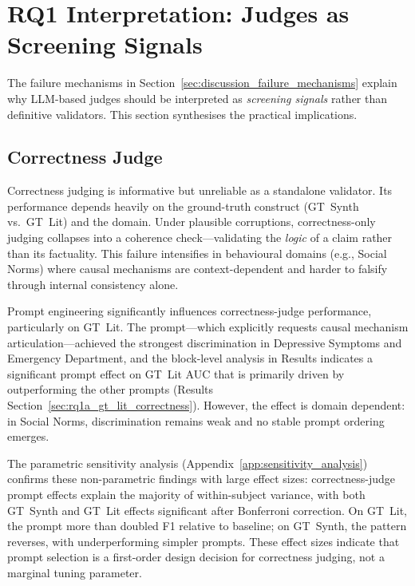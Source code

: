 \section{RQ1 Interpretation: Judges as Screening Signals}
\label{sec:discussion_rq1a_correctness}
\label{sec:discussion_rq1a_citation}
\label{sec:discussion_judge_human_agreement}
The failure mechanisms in Section~\ref{sec:discussion_failure_mechanisms} explain why LLM-based judges should be interpreted as \emph{screening signals} rather than definitive validators. This section synthesises the practical implications.

\subsection{Correctness Judge}
Correctness judging is informative but unreliable as a standalone validator. Its performance depends heavily on the ground-truth construct (GT~Synth vs.\ GT~Lit) and the domain. Under plausible corruptions, correctness-only judging collapses into a coherence check---validating the \emph{logic} of a claim rather than its factuality. This failure intensifies in behavioural domains (e.g., Social Norms) where causal mechanisms are context-dependent and harder to falsify through internal consistency alone.

Prompt engineering significantly influences correctness-judge performance, particularly on GT~Lit. The \PromptMechanistic{} prompt---which explicitly requests causal mechanism articulation---achieved the strongest discrimination in Depressive Symptoms and Emergency Department, and the block-level analysis in Results indicates a significant prompt effect on GT~Lit AUC that is primarily driven by \PromptMechanistic{} outperforming the other prompts (Results Section~\ref{sec:rq1a_gt_lit_correctness}). However, the effect is domain dependent: in Social Norms, discrimination remains weak and no stable prompt ordering emerges.

The parametric sensitivity analysis (Appendix~\ref{app:sensitivity_analysis}) confirms these non-parametric findings with large effect sizes: correctness-judge prompt effects explain the majority of within-subject variance, with both GT~Synth and GT~Lit effects significant after Bonferroni correction. On GT~Lit, the \PromptMechanistic{} prompt more than doubled F1 relative to baseline; on GT~Synth, the pattern reverses, with \PromptMechanistic{} underperforming simpler prompts. These effect sizes indicate that prompt selection is a first-order design decision for correctness judging, not a marginal tuning parameter.

